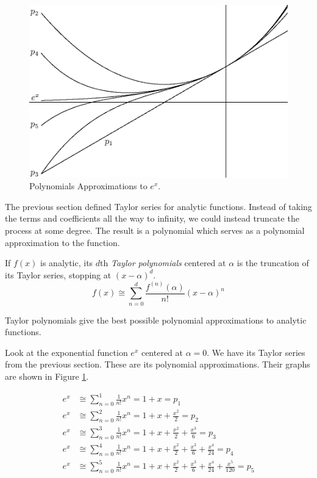 \documentclass[fleqn,letterpaper]{report}
\begin{document}
\begin{figure}[ht]
\centering
\includegraphics[width=12cm]{figure35.eps}
\caption{Polynomials Approximations to $e^x$.}
\label{figure-exponential-approximation}
\end{figure}

The previous section defined Taylor series for analytic
functions. Instead of taking the terms and coefficients all
the way to infinity, we could instead truncate the process at
some degree. The result is a polynomial which serves as a
polynomial approximation to the function. 

\begin{defn}
If $f(x)$ is analytic, its $d$th \emph{Taylor polynomials}
centered at $\alpha$ is the truncation of its Taylor series,
stopping at $(x-\alpha)^d$. 
\begin{equation*}
f(x) \cong \sum_{n=0}^d \frac{f^{(n)}(\alpha)}{n!} (x-\alpha)^n
\end{equation*}
\end{defn}

Taylor polynomials give the best possible polynomial
approximations to analytic functions.

\begin{example}
Look at the exponential function $e^x$ centered at $\alpha =
0$. We have its Taylor series from the previous section. These
are its polynomial approximations. Their graphs are shown in
Figure \ref{figure-exponential-approximation}.

\begin{align*}
e^x & \cong \sum_{n=0}^1 \frac{1}{n!} x^n = 1 + x = p_1 \\
e^x & \cong \sum_{n=0}^2 \frac{1}{n!} x^n = 1 + x +
\frac{x^2}{2} = p_2 \\
e^x & \cong \sum_{n=0}^3 \frac{1}{n!} x^n = 1 + x +
\frac{x^2}{2} + \frac{x^3}{6} = p_3 \\
e^x & \cong \sum_{n=0}^4 \frac{1}{n!} x^n = 1 + x +
\frac{x^2}{2} + \frac{x^3}{6} + \frac{x^4}{24} = p_4 \\
e^x & \cong \sum_{n=0}^5 \frac{1}{n!} x^n = 1 + x +
\frac{x^2}{2} + \frac{x^3}{6} + \frac{x^4}{24} +
\frac{x^5}{120} = p_5
\end{align*}
\end{example}
\end{document}
